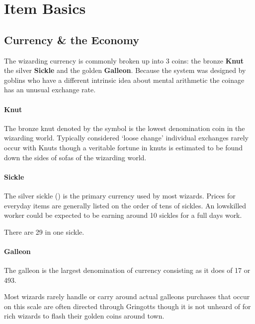 \chapter{Item Basics}

\section{Currency \& the Economy}

The wizarding currency is commonly broken up into 3 coins: the bronze {\bf Knut}\comma{} the silver {\bf Sickle} and the golden {\bf Galleon}. Because the system was designed by goblins \minus{} who have a different intrinsic idea about mental arithmetic \minus{} the coinage has an unusual exchange rate.

\subsubsection{Knut}

The bronze knut\comma{} denoted by the symbol \knut{}\comma{} is the lowest denomination coin in the wizarding world. Typically considered `loose change'\comma{} individual exchanges rarely occur with Knuts\comma{} though a veritable fortune in knuts is estimated to be found down the sides of sofas of the wizarding world. 

\subsubsection{Sickle}

The silver sickle (\sickle{}) is the primary currency used by most wizards. Prices for everyday items are generally listed on the order of tens of sickles. An low\minus{}skilled worker could be expected to be earning around 10 sickles for a full days work. 

There are 29\knut{} in one sickle. 

\subsubsection{Galleon}

The galleon\comma{} \galleon{}\comma{} is the largest denomination of currency\comma{} consisting as it does of 17\sickle{}\comma{} or 493\knut{}. 

Most wizards rarely handle or carry around actual galleons \minus{} purchases that occur on this scale are often directed through Gringotts \minus{} though it is not unheard of for rich wizards to flash their golden coins around town.

